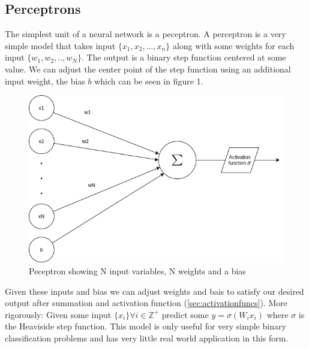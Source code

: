 \documentclass{article}
\begin{document}
\subsection{Perceptrons}
\label{sec:peceptrons}
The simplest unit of a neural network is a peceptron. A perceptron is a very simple model that takes input $\{x_1, x_2, ... ,x_n\}$ along with some weights for each input $\{w_1, w_2, .., w_N\}$. The output is a binary step function centered at some value. \cite{Nielsen} We can adjust the center point of the step function using an additional input weight, the bias $b$ which can be seen in figure 1.
\begin{figure}[H]
\caption{Peceptron showing N input variables, N weights and a bias}
\includegraphics[scale=0.5]{peceptron.png}
\end{figure}
Given these inputs and bias we can adjust weights and bais to satisfy our desired output after summation and activation function (\ref{sec:activationfuncs}). 
More rigorously: Given some input $\{x_i\} \forall i\in \mathbb{Z^+}$ predict some $y=\sigma(W_i x_i)$ where $\sigma$ is the Heaviside step function. This model is only useful for very simple binary classification problems and has very little real world application in this form.
\end{document}
